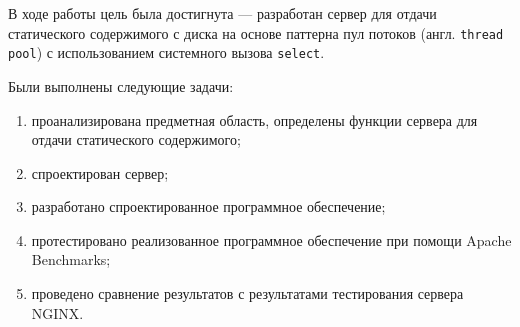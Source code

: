 
В ходе работы цель была достигнута --- разработан сервер для отдачи статического содержимого с диска на основе паттерна пул потоков (англ. \texttt{thread pool}) с использованием системного вызова \texttt{select}.

Были выполнены следующие задачи:
\begin{enumerate}
	\item проанализирована предметная область, определены функции сервера для отдачи статического содержимого;
	\item спроектирован сервер;
	\item разработано спроектированное программное обеспечение;
	\item протестировано реализованное программное обеспечение при помощи Apache Benchmarks;
	\item проведено сравнение результатов с результатами тестирования сервера NGINX.
\end{enumerate}